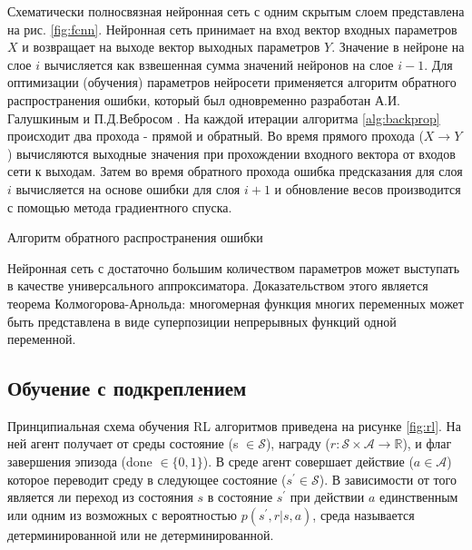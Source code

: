 Схематически полносвязная нейронная сеть с одним скрытым слоем представлена на рис. \ref{fig:fcnn}. Нейронная сеть принимает на вход вектор входных параметров $X$ и возвращает на выходе вектор выходных параметров $Y$. Значение в нейроне на слое $i$ вычисляется как взвешенная сумма значений нейронов на слое $i - 1$. Для оптимизации (обучения) параметров нейросети применяется алгоритм обратного распространения ошибки, который был одновременно разработан А.И. Галушкиным \cite{Galushkin} и П.Д.Вебросом \cite{webros_1974}. На каждой итерации алгоритма \ref{alg:backprop} происходит два прохода - прямой и обратный. Во время прямого прохода ($X \to Y$) вычисляются выходные значения при прохождении входного вектора от входов сети к выходам. Затем во время обратного прохода ошибка предсказания для слоя $i$ вычисляется на основе ошибки для слоя $i + 1$ и обновление весов производится с помощью метода градиентного спуска. 

\begin{algorithm}[ht]
	\SetAlgoLined
	\caption{Алгоритм обратного распространения ошибки}
	\label{alg:backprop}

\end{algorithm}

Нейронная сеть с достаточно большим количеством параметров может выступать в качестве универсального аппроксиматора. Доказательством этого является теорема Колмогорова-Арнольда\cite{kolmogorov, arnold}: многомерная функция многих переменных может быть представлена в виде суперпозиции непрерывных функций одной переменной. 


\subsection{Обучение с подкреплением}

Принципиальная схема обучения RL алгоритмов приведена на рисунке \ref{fig:rl}. На ней агент получает от среды состояние (s $\in \mathcal{S}$), награду ($r: \mathcal{S} \times \mathcal{A} \to \mathbb{R}$), и флаг завершения эпизода (done $\in \{0, 1\}$).  В среде агент совершает действие ($a \in \mathcal{A}$) которое переводит среду в следующее состояние ($s^{\prime} \in \mathcal{S}$). В зависимости от того является ли переход из состояния $s$ в состояние $s^{\prime}$ при действии $a$ единственным или одним из возможных с вероятностью $p(s^{\prime},r|s,a)$, среда называется детерминированной или не детерминированной. 


